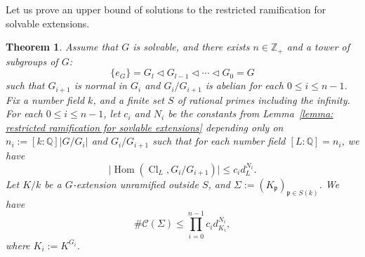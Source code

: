 \documentclass[12pt,a4paper]{amsart}
\numberwithin{equation}{section}%
\theoremstyle{plain}%
\newtheorem{theorem}{Theorem}[section]%
\theoremstyle{definition}%
\theoremstyle{remark}%
\begin{document}
	Let us prove an upper bound of solutions to the restricted ramification for solvable extensions.
	\begin{theorem}\label{thm: restricted ramification for solvable extensions}
		Assume that $G$ is solvable, and there exists $n\in\mathbb{Z}_+$ and a tower of subgroups of $G$:
		\begin{equation*}
			\{e_G\}=G_{l}\triangleleft G_{l-1}\triangleleft\cdots\triangleleft G_0=G
		\end{equation*}
		such that $G_{i+1}$ is normal in $G_i$ and $G_i/G_{i+1}$ is abelian for each $0\leq i\leq n-1$.
		Fix a number field $k$, and a finite set $S$ of rational primes including the infinity.
		For each $0\leq i\leq n-1$, let $c_i$ and $N_i$ be the constants from Lemma~\ref{lemma: restricted ramification for sovlable extensions} depending only on $n_i:=[k:\mathbb{Q}]\lvert G/G_i\rvert$ and $G_{i}/G_{i+1}$ such that for each number field $[L:\mathbb{Q}]=n_i$, we have
		\begin{equation*}
			\lvert\operatorname{Hom}(\operatorname{Cl}_L,G_i/G_{i+1})\rvert\leq c_id_L^{N_i}.
		\end{equation*}
		Let $K/k$ be a $G$-extension unramified outside $S$, and $\Sigma:=(K_{\mathfrak{p}})_{\mathfrak{p}\in S(k)}$.
		We have
		\begin{equation}\label{eqn: restricted ramification for solvable extensions thm 1}
			\#\mathcal{C}(\Sigma)\leq \prod_{i=0}^{n-1}c_id_{K_i}^{N_i},
		\end{equation}
		where $K_i:=K^{G_i}$.
	\end{theorem}
\end{document}
